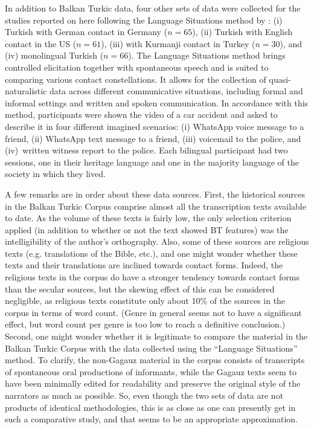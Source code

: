 \documentclass[output=paper,colorlinks,citecolor=brown]{langscibook}
\begin{document}
In addition to Balkan Turkic data, four other sets of data were collected for the studies reported on here following the Language Situations method by \citet{Wiese.2020}: (i) Turkish with German contact in Germany ($n = 65$), (ii) Turkish with English contact in the US ($n = 61$), (iii) with Kurmanji contact in Turkey ($n = 30$), and (iv) monolingual Turkish ($n = 66$). The Language Situations method brings controlled elicitation together with spontaneous speech and is suited to comparing various contact constellations. It allows for the collection of quasi\hyp{}naturalistic data across different communicative situations, including formal and informal settings and written and spoken communication. In accordance with this method, participants were shown the video of a car accident and asked to describe it in four different imagined scenarios: (i) WhatsApp voice message to a friend, (ii) WhatsApp text message to a friend, (iii) voicemail to the police, and (iv)~written witness report to the police. Each bilingual participant had two sessions, one in their heritage language and one in the majority language of the society in which they lived. 

\begin{sloppypar}
A few remarks are in order about these data sources. First, the historical sources in the Balkan Turkic Corpus comprise almost all the transcription texts available to date. As the volume of these texts is fairly low, the only selection criterion applied (in addition to whether or not the text showed BT features) was the intelligibility of the author's orthography. Also, some of these sources are religious texts (e.g. translations of the Bible, etc.), and one might wonder whether these texts and their translations are inclined towards contact forms. Indeed, the religious texts in the corpus do have a stronger tendency towards contact forms than the secular sources, but the skewing effect of this can be considered negligible, as religious texts constitute only about 10\% of the sources in the corpus in terms of word count. (Genre in general seems not to have a significant effect, but word count per genre is too low to reach a definitive conclusion.) Second, one might wonder whether it is legitimate to compare the material in the Balkan Turkic Corpus with the data collected using the “Language Situations” method. To clarify, the non-Gagauz material in the corpus consists of transcripts of spontaneous oral productions of informants, while the Gagauz texts seem to have been minimally edited for readability and preserve the original style of the narrators as much as possible. So, even though the two sets of data are not products of identical methodologies, this is as close as one can presently get in such a comparative study, and that seems to be an appropriate approximation.
\end{sloppypar}
\end{document}
